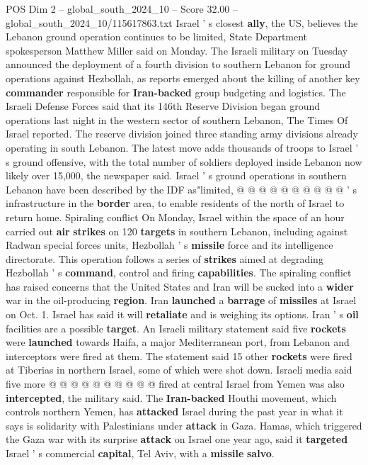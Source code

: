 \begin{textsample}{POS Dim 2 – global\_south\_2024\_10 – Score 32.00 – global\_south\_2024\_10/115617863.txt}
Israel ' s closest \textbf{ally}, the US, believes the Lebanon ground operation continues to be limited, State Department spokesperson Matthew Miller said on Monday.
The Israeli military on Tuesday announced the deployment of a fourth division to southern Lebanon for ground operations against Hezbollah, as reports emerged about the killing of another key \textbf{commander} responsible for \textbf{Iran-backed} group budgeting and logistics.
The Israeli Defense Forces said that its 146th Reserve Division began ground operations last night in the western sector of southern Lebanon, The Times Of Israel reported.
The reserve division joined three standing army divisions already operating in south Lebanon.
The latest move adds thousands of troops to Israel ' s ground offensive, with the total number of soldiers deployed inside Lebanon now likely over 15,000, the newspaper said.
Israel ' s ground operations in southern Lebanon have been described by the IDF as"limited, @ @ @ @ @ @ @ @ @ @ ' s infrastructure in the \textbf{border} area, to enable residents of the north of Israel to return home.
Spiraling conflict On Monday, Israel within the space of an hour carried out \textbf{air} \textbf{strikes} on 120 \textbf{targets} in southern Lebanon, including against Radwan special forces units, Hezbollah ' s \textbf{missile} force and its intelligence directorate.
This operation follows a series of \textbf{strikes} aimed at degrading Hezbollah ' s \textbf{command}, control and firing \textbf{capabilities}.
The spiraling conflict has raised concerns that the United States and Iran will be sucked into a \textbf{wider} war in the oil-producing \textbf{region}.
Iran \textbf{launched} a \textbf{barrage} of \textbf{missiles} at Israel on Oct. 1.
Israel has said it will \textbf{retaliate} and is weighing its options.
Iran ' s \textbf{oil} facilities are a possible \textbf{target}.
An Israeli military statement said five \textbf{rockets} were \textbf{launched} towards Haifa, a major Mediterranean port, from Lebanon and interceptors were fired at them.
The statement said 15 other \textbf{rockets} were fired at Tiberias in northern Israel, some of which were shot down.
Israeli media said five more @ @ @ @ @ @ @ @ @ @ fired at central Israel from Yemen was also \textbf{intercepted}, the military said.
The \textbf{Iran-backed} Houthi movement, which controls northern Yemen, has \textbf{attacked} Israel during the past year in what it says is solidarity with Palestinians under \textbf{attack} in Gaza.
Hamas, which triggered the Gaza war with its surprise \textbf{attack} on Israel one year ago, said it \textbf{targeted} Israel ' s commercial \textbf{capital}, Tel Aviv, with a \textbf{missile} \textbf{salvo}.

\end{textsample}

